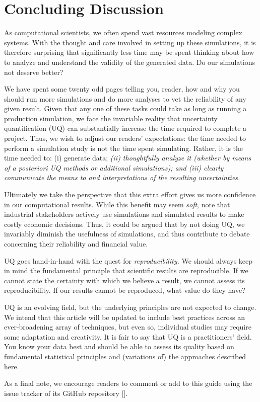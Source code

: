 %
%
%

\section{Concluding Discussion}

As computational scientists, we often spend vast resources modeling complex systems.  With the thought and care involved in setting up these simulations, it is therefore surprising that  significantly less time may be spent thinking about how to analyze and understand the validity of the generated data.  Do our simulations not deserve better? 

We have spent some twenty odd pages telling you, reader, how and why you should run more simulations and do more analyses to vet the reliability of any given result.  Given that any one of these tasks could take as long as running a production simulation, we face the invariable reality that uncertainty quantification (UQ) can substantially increase the time required to complete a project.
Thus, we wish to adjust our readers' expectations: the time needed to perform a simulation study is not the time spent simulating.  Rather, it is the time needed to: (i) generate data; {\it (ii) thoughtfully analyze it (whether by means of a posteriori UQ methods or additional simulations); and (iii) clearly communicate the means to and interpretations of the resulting uncertainties.}

Ultimately we take the perspective that this extra effort gives us more confidence in our computational results.  While this benefit may seem {\it soft}, note that industrial stakeholders actively use simulations and simulated results to make costly economic decisions.  Thus, it could be argued that by not doing UQ, we invariably diminish the usefulness of simulations, and thus contribute to debate concerning their reliability and financial value.

UQ goes hand-in-hand with the quest for \emph{reproducibility.}  We should always keep in mind the fundamental principle that scientific results are reproducible.  If we cannot state the certainty with which we believe a result, we cannot assess its reproducibility.  If our results cannot be reproduced, what value do they have?

UQ is an evolving field, but the underlying principles are not expected to change.
We intend that this article will be updated to include best practices across an ever-broadening array of techniques, but even so, individual studies may require some adaptation and creativity.
It is fair to say that UQ is a practitioners' field.  You know your data best and should be able to assess its quality based on fundamental statistical principles and (variations of) the approaches described here.

As a final note, we encourage readers to comment or add to this guide using the issue tracker of its GitHub repository [\githubrepository].
